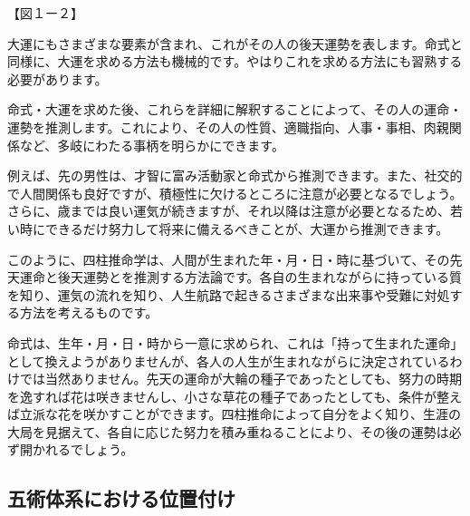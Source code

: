\documentclass[a4paper,11pt,twocolumn,dvipdfmx]{tarticle}
\begin{document}
【図１ー２】

大運にもさまざまな要素が含まれ、これがその人の後天運勢を表します。命式と同様に、大運を求める方法も機械的です。やはりこれを求める方法にも習熟する必要があります。

命式・大運を求めた後、これらを詳細に解釈することによって、その人の運命・運勢を推測します。これにより、その人の性質、適職指向、人事・事相、肉親関係など、多岐にわたる事柄を明らかにできます。

例えば、先の男性は、才智に富み活動家と命式から推測できます。また、社交的で人間関係も良好ですが、積極性に欠けるところに注意が必要となるでしょう。さらに、歳までは良い運気が続きますが、それ以降は注意が必要となるため、若い時にできるだけ努力して将来に備えるべきことが、大運から推測できます。

このように、四柱推命学は、人間が生まれた年・月・日・時に基づいて、その先天運命と後天運勢とを推測する方法論です。各自の生まれながらに持っている質を知り、運気の流れを知り、人生航路で起きるさまざまな出来事や受難に対処する方法を考えるものです。

命式は、生年・月・日・時から一意に求められ、これは「持って生まれた運命」として換えようがありませんが、各人の人生が生まれながらに決定されているわけでは当然ありません。先天の運命が大輪の種子であったとしても、努力の時期を逸すれば花は咲きませんし、小さな草花の種子であったとしても、条件が整えば立派な花を咲かすことができます。四柱推命によって自分をよく知り、生涯の大局を見据えて、各自に応じた努力を積み重ねることにより、その後の運勢は必ず開かれるでしょう。

\subsection{五術体系における位置付け}
\end{document}
